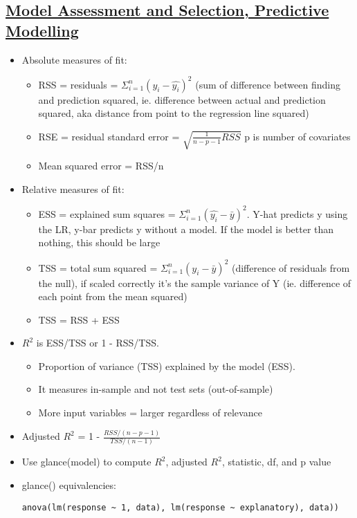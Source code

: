 \documentclass[8pt,landscape,a4paper, fleqn, dvipsnames]{extarticle}
\begin{document}
\begin{multicols*}{4}
\section*{\ul{Model Assessment and Selection, Predictive Modelling}}
\begin{itemize}
    \item Absolute measures of fit:
    \begin{itemize}
        \item RSS = residuals = $\Sigma_{i = 1}^n (y_i - \hat{y_i})^2$ (sum of difference between finding and prediction squared, ie. difference between actual and prediction squared, aka distance from point to the regression line squared)
        \item RSE = residual standard error = $\sqrt{\frac{1}{n - p - 1} RSS}$ p is number of covariates
        \item Mean squared error = RSS/n
    \end{itemize}
    \item Relative measures of fit:
    \begin{itemize}
        \item ESS = explained sum squares = $\Sigma_{i = 1}^n (\hat{y_i} - \bar{y})^2$. Y-hat predicts y using the LR, y-bar predicts y without a model. If the model is better than nothing, this should be large
        \item TSS = total sum squared = $\Sigma_{i = 1}^n (y_i - \bar{y})^2$ (difference of residuals from the null), if scaled correctly it's the sample variance of Y (ie. difference of each point from the mean squared)
        \item TSS = RSS + ESS
    \end{itemize}
    \item $R^2$ is ESS/TSS or 1 - RSS/TSS. 
    \begin{itemize}
        \item Proportion of variance (TSS) explained by the model (ESS).
        \item It measures in-sample and not test sets (out-of-sample)
        \item More input variables = larger regardless of relevance
    \end{itemize}
    \item Adjusted $R^2$ = 1 - $\frac{RSS/(n - p - 1)}{TSS/(n - 1)}$
    \item Use glance(model) to compute $R^2$, adjusted $R^2$, statistic, df, and p value
    \item glance() equivalencies:
    \begin{lstlisting}
anova(lm(response ~ 1, data), lm(response ~ explanatory), data))


\end{lstlisting}
\end{itemize}
\end{multicols*}
\end{document}
